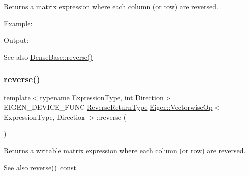\begin{DoxyReturn}{Returns}
a matrix expression where each column (or row) are reversed.
\end{DoxyReturn}
Example\+: 
\begin{DoxyCodeInclude}{0}
\end{DoxyCodeInclude}
 Output\+: 
\begin{DoxyVerbInclude}
\end{DoxyVerbInclude}


\begin{DoxySeeAlso}{See also}
\mbox{\hyperlink{class_eigen_1_1_dense_base_a38ea394036d8b096abf322469c80198f}{Dense\+Base\+::reverse()}} 
\end{DoxySeeAlso}
\mbox{\label{class_eigen_1_1_vectorwise_op_a094915725d604015221205e8c4ccb993}} 
\subsubsection{\texorpdfstring{reverse()}{reverse()}\hspace{0.1cm}{\footnotesize\ttfamily [2/2]}}
{\footnotesize\ttfamily template$<$typename Expression\+Type, int Direction$>$ \\
E\+I\+G\+E\+N\+\_\+\+D\+E\+V\+I\+C\+E\+\_\+\+F\+U\+NC \mbox{\hyperlink{class_eigen_1_1_reverse}{Reverse\+Return\+Type}} \mbox{\hyperlink{class_eigen_1_1_vectorwise_op}{Eigen\+::\+Vectorwise\+Op}}$<$ Expression\+Type, Direction $>$\+::reverse (\begin{DoxyParamCaption}{ }\end{DoxyParamCaption})\hspace{0.3cm}{\ttfamily [inline]}}

\begin{DoxyReturn}{Returns}
a writable matrix expression where each column (or row) are reversed.
\end{DoxyReturn}
\begin{DoxySeeAlso}{See also}
\mbox{\hyperlink{class_eigen_1_1_vectorwise_op_a058b821b65e2e27839853d9a25b0216c}{reverse() const }} 
\end{DoxySeeAlso}
\mbox{\label{class_eigen_1_1_vectorwise_op_ab9dd7c273eb2ba8defaab2d55156936b}} 
